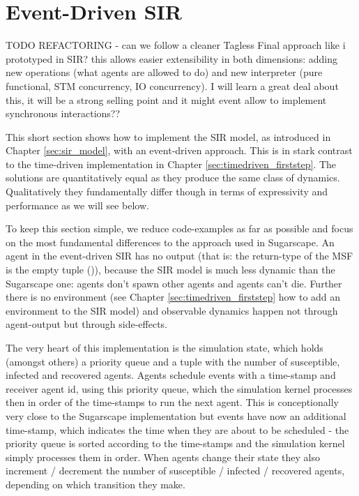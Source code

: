 \section{Event-Driven SIR}
\label{sec:eventdriven_sir}
TODO REFACTORING
- can we follow a cleaner Tagless Final approach like i prototyped in SIR? this allows easier extensibility in both dimensions: adding new operations (what agents are allowed to do) and new interpreter (pure functional, STM concurrency, IO concurrency). I will learn a great deal about this, it will be a strong selling point and it might event allow to implement synchronous interactions??

This short section shows how to implement the SIR model, as introduced in Chapter \ref{sec:sir_model}, with an event-driven approach. This is in stark contrast to the time-driven implementation in Chapter \ref{sec:timedriven_firststep}. The solutions are quantitatively equal as they produce the same class of dynamics. Qualitatively they fundamentally differ though in terms of expressivity and performance as we will see below.

To keep this section simple, we reduce code-examples as far as possible and focus on the most fundamental differences to the approach used in Sugarscape. An agent in the event-driven SIR has no output (that is: the return-type of the MSF is the empty tuple ()), because the SIR model is much less dynamic than the Sugarscape one: agents don't spawn other agents and agents can't die. Further there is no environment (see Chapter \ref{sec:timedriven_firststep} how to add an environment to the SIR model) and observable dynamics happen not through agent-output but through side-effects.

The very heart of this implementation is the simulation state, which holds (amongst others) a priority queue and a tuple with the number of susceptible, infected and recovered agents. Agents schedule events with a time-stamp and receiver agent id, using this priority queue, which the simulation kernel processes then in order of the time-stamps to run the next agent. This is conceptionally very close to the Sugarscape implementation but events have now an additional time-stamp, which indicates the time when they are about to be scheduled - the priority queue is sorted according to the time-stamps and the simulation kernel simply processes them in order. When agents change their state they also increment / decrement the number of susceptible / infected / recovered agents, depending on which transition they make.

